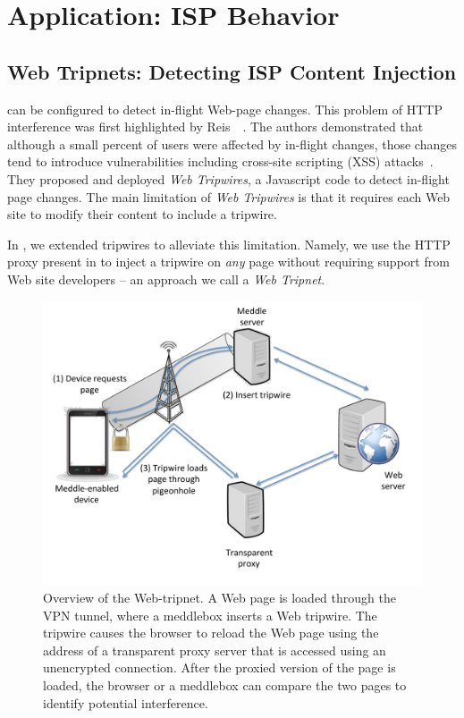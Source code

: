 \section{Application: ISP Behavior}



\subsection{Web Tripnets: Detecting ISP Content Injection}

\meddle can be configured to detect in-flight Web-page changes. 
This problem of HTTP interference was first highlighted by Reis~\etal~\cite{reis:tripwires}. 
The authors demonstrated that although a small percent of users were affected by in-flight changes, those changes tend to introduce vulnerabilities including cross-site scripting (XSS) attacks~\cite{reis:tripwires}. 
They proposed and deployed \emph{Web Tripwires}, a Javascript code to detect in-flight page changes. 
The main limitation of \emph{Web Tripwires} is that it requires each Web site to modify their content to include a tripwire.

In \meddle, we extended tripwires to alleviate this limitation. 
Namely, we use the HTTP proxy present in \meddle to inject a tripwire on \emph{any} page without requiring support from Web site developers -- an approach we call a \emph{Web Tripnet}.


\begin{figure}
\centering
\includegraphics[width=0.9\linewidth]{figures/tripnet.pdf}
\caption{Overview of the \meddle Web-tripnet. A Web page is loaded
through the VPN tunnel, where a meddlebox inserts a Web tripwire. The
tripwire causes the browser to reload the Web page using the address of a
transparent proxy server that is accessed using an unencrypted connection.
After the proxied version of the page is loaded, the browser or a meddlebox
can compare the two pages to identify potential interference. }
\label{fig:tripnet}
\end{figure}

